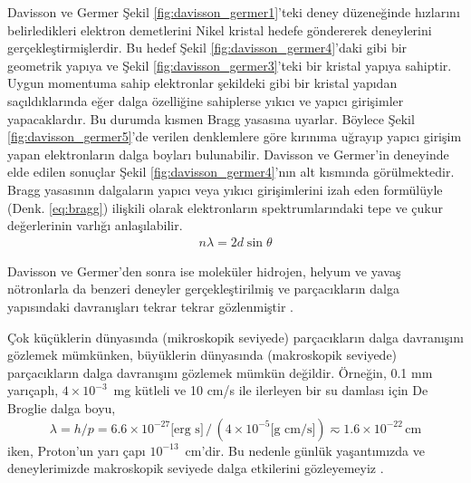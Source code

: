 \documentclass[a4paper,12pt, twoside]{article}
\begin{document}
Davisson ve Germer Şekil \ref{fig:davisson_germer1}'teki deney düzeneğinde hızlarını belirledikleri elektron demetlerini Nikel kristal hedefe göndererek deneylerini gerçekleştirmişlerdir. Bu hedef Şekil \ref{fig:davisson_germer4}'daki gibi bir geometrik yapıya ve Şekil \ref{fig:davisson_germer3}'teki bir kristal yapıya sahiptir. Uygun momentuma sahip elektronlar şekildeki gibi bir kristal yapıdan saçıldıklarında eğer dalga özelliğine sahiplerse yıkıcı ve yapıcı girişimler yapacaklardır. Bu durumda kısmen Bragg yasasına uyarlar. Böylece Şekil \ref{fig:davisson_germer5}'de verilen denklemlere göre kırınıma uğrayıp yapıcı girişim yapan elektronların dalga boyları bulunabilir. Davisson ve Germer'in deneyinde elde edilen sonuçlar Şekil \ref{fig:davisson_germer4}'nın alt kısmında görülmektedir. Bragg yasasının dalgaların yapıcı veya yıkıcı girişimlerini izah eden formülüyle (Denk. \ref{eq:bragg}) ilişkili olarak elektronların spektrumlarındaki tepe ve çukur değerlerinin varlığı anlaşılabilir.
\begin{align}
\label{eq:bragg}
n\lambda = 2 d \sin\theta
\end{align}

Davisson ve Germer'den sonra ise moleküler hidrojen, helyum ve yavaş nötronlarla da benzeri deneyler gerçekleştirilmiş ve parçacıkların dalga yapısındaki davranışları tekrar tekrar gözlenmiştir \cite{book:Gasiorowicz}.

Çok küçüklerin dünyasında (mikroskopik seviyede) parçacıkların dalga davranışını gözlemek mümkünken, büyüklerin dünyasında (makroskopik seviyede) parçacıkların dalga davranışını gözlemek mümkün değildir. Örneğin, 0.1 mm yarıçaplı, $4\times 10^{-3}$~mg kütleli ve 10 cm/s ile ilerleyen bir su damlası için De Broglie dalga boyu,
\begin{equation*}
\lambda = h/p = 6.6\times 10^{-27} \text{[erg s]}\,/\,(4\times 10^{-5} \text{[g cm/s]}) \eqsim 1.6\times 10^{-22}\,\text{cm}
\end{equation*}
iken, Proton'un yarı çapı $10^{-13}$~cm'dir. Bu nedenle günlük yaşantımızda ve deneylerimizde makroskopik seviyede dalga etkilerini gözleyemeyiz \cite{book:Gasiorowicz}. 

\end{document}
